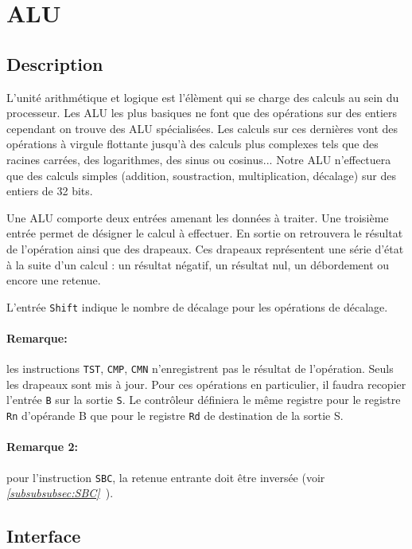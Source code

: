 \section{ALU}

\subsection{Description}

	L'unité arithmétique et logique est l'élèment qui se charge des calculs au sein du processeur. Les ALU les plus basiques ne font que des opérations sur des entiers cependant on trouve des ALU spécialisées. Les calculs sur ces dernières vont des opérations à virgule flottante jusqu'à des calculs plus complexes tels que des racines carrées, des logarithmes, des sinus ou cosinus... Notre ALU n'effectuera que des calculs simples (addition, soustraction, multiplication, décalage) sur des entiers de 32 bits.

	Une ALU comporte deux entrées amenant les données à traiter. Une troisième entrée permet de désigner le calcul à effectuer. En sortie on retrouvera le résultat de l'opération ainsi que des drapeaux. Ces drapeaux représentent une série d'état à la suite d'un calcul : un résultat négatif, un résultat nul, un débordement ou encore une retenue. 

L'entrée \texttt{Shift} indique le nombre de décalage pour les opérations de décalage.


\paragraph{Remarque:} les instructions \texttt{TST}, \texttt{CMP}, \texttt{CMN} n'enregistrent pas le résultat de l'opération. Seuls les drapeaux sont mis à jour.
Pour ces opérations en particulier, il faudra recopier l'entrée \texttt{B} sur la sortie \texttt{S}. Le contrôleur définiera le même registre pour le registre \texttt{Rn} d'opérande B que pour le registre \texttt{Rd} de destination de la sortie S.

\paragraph{Remarque 2:} pour l'instruction \texttt{SBC}, la retenue entrante doit être inversée (voir \textit{\ref{subsubsubsec:SBC}~}).

\subsection{Interface}

